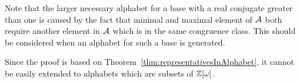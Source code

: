 Note that the larger necessary alphabet for a base with a real conjugate greater than one is caused by the fact that minimal and maximal element of $\mathcal{A}$ both require another element in $\mathcal{A}$ which is in the same congruence class. This should be considered when an alphabet for such a base is generated.

Since the proof is based on Theorem~\ref{thm:representativesInAlphabet}, it cannot be easily extended to alphabets which are subsets of  $\mathbb{Z}[\omega]$.


